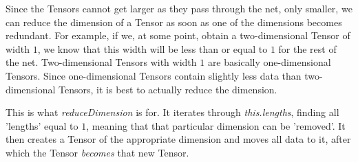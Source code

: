 \documentclass[12pt, titlepage]{article}
\begin{document}
    Since the Tensors cannot get larger as they pass through the net, only smaller, we can reduce the dimension of a Tensor as soon as one of the dimensions becomes redundant. For example, if we, at some point, obtain a two-dimensional Tensor of width $1$, we know that this width will be less than or equal to $1$ for the rest of the net. Two-dimensional Tensors with width $1$ are basically one-dimensional Tensors. Since one-dimensional Tensors contain slightly less data than two-dimensional Tensors, it is best to actually reduce the dimension.
    
    This is what \textit{reduceDimension} is for. It iterates through \textit{this.lengths}, finding all 'lengths' equal to $1$, meaning that that particular dimension can be 'removed'. It then creates a Tensor of the appropriate dimension and moves all data to it, after which the Tensor \textit{becomes} that new Tensor.
    
\end{document}

